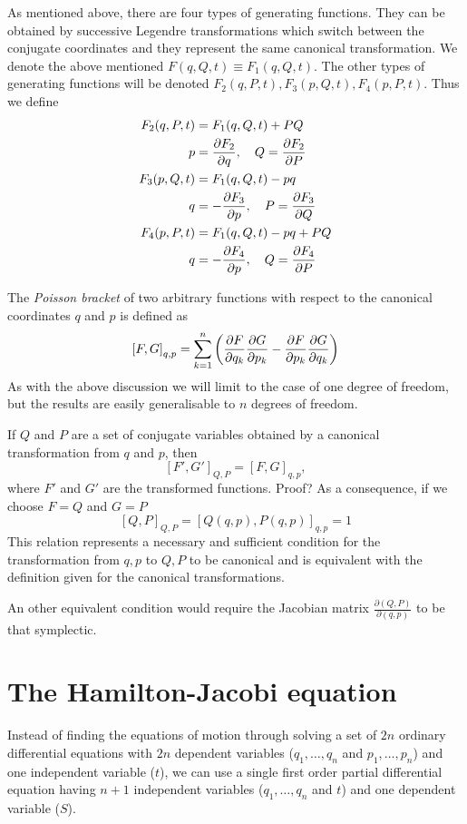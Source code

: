 \documentclass[../thesis.tex]{subfiles}
\begin{document}
As mentioned above, there are four types of generating functions. They can be obtained
by successive Legendre transformations which switch between the conjugate coordinates and
they represent the same canonical transformation. We denote the above mentioned
\(F(q, Q, t) \equiv F_1(q, Q, t)\). The other types of generating functions will be denoted
\(F_2(q, P, t), F_3(p, Q, t), F_4(p, P, t)\). Thus we define
\begin{align*}
  F_2(q, P, t) &= F_1(q, Q, t) + PQ \\
  p &= \pdv{F_2}{q},\quad Q = \pdv{F_2}{P} \\
  F_3(p, Q, t) &= F_1(q, Q, t) - pq \\
  q &= - \pdv{F_3}{p},\quad P = \pdv{F_3}{Q} \\
  F_4(p, P, t) &= F_1(q, Q, t) - pq + PQ \\
  q &= - \pdv{F_4}{p},\quad Q = \pdv{F_4}{P}
\end{align*}


The \emph{Poisson bracket} of two arbitrary functions with respect to the canonical coordinates
$q$ and $p$ is defined as
\[
  {\left[F, G\right]}_{q,p} = \sum_{k=1}^n \left( \pdv{F}{q_k} \pdv{G}{p_k} -
                                                  \pdv{F}{p_k} \pdv{G}{q_k} \right)
\]
As with the above discussion we will limit to the case of one degree of freedom,
but the results are easily generalisable to $n$ degrees of freedom.

If $Q$ and $P$ are a set of conjugate variables obtained by a canonical transformation
from $q$ and $p$, then
\[
  {\left[F', G'\right]}_{Q,P} = {\left[F, G\right]}_{q,p},
\]
where $F'$ and $G'$ are the transformed functions.
{\color{red}Proof?}
As a consequence, if we choose \(F=Q\) and \(G=P\)
\[
  {\left[Q, P\right]}_{Q,P} = {\left[Q(q,p), P(q,p)\right]}_{q,p} = 1
\]
This relation represents a necessary and sufficient condition for the transformation from
$q,p$ to $Q,P$ to be canonical and is equivalent with the definition given for the
canonical transformations.

An other equivalent condition would require the Jacobian matrix
\(\frac{\partial(Q,P)}{\partial(q,p)}\) to be that symplectic.

\section{The Hamilton-Jacobi equation}

Instead of finding the equations of motion through solving a set of \(2n\) ordinary differential
equations with \(2n\) dependent variables (\(q_1, \dotsc, q_n\) and \(p_1, \dotsc, p_n\))
and one independent variable (\(t\)), we can use a single first order partial differential equation
having \(n+1\) independent variables (\(q_1, \dotsc, q_n\) and \(t\)) and one
dependent variable (\(S\)).
\end{document}
